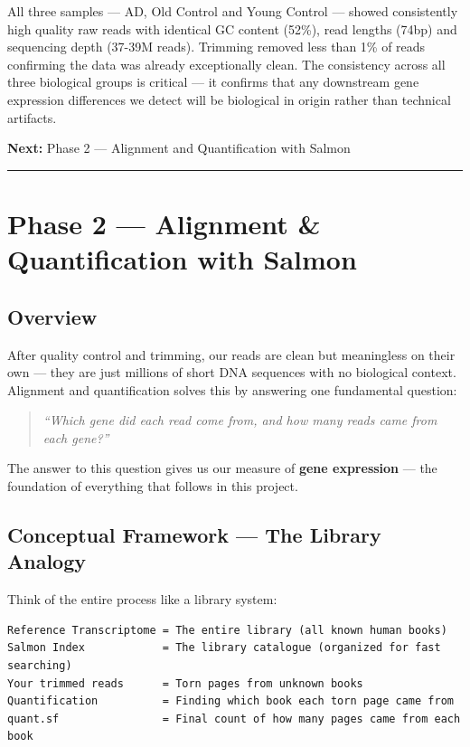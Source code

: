 \documentclass[
]{article}
\begin{document}
All three samples --- AD, Old Control and Young Control --- showed
consistently high quality raw reads with identical GC content (52\%),
read lengths (74bp) and sequencing depth (37-39M reads). Trimming
removed less than 1\% of reads confirming the data was already
exceptionally clean. The consistency across all three biological groups
is critical --- it confirms that any downstream gene expression
differences we detect will be biological in origin rather than technical
artifacts.

\textbf{Next:} Phase 2 --- Alignment and Quantification with Salmon

\begin{center}\rule{0.5\linewidth}{0.5pt}\end{center}

\section{Phase 2 --- Alignment \& Quantification with
Salmon}\label{phase-2-alignment-quantification-with-salmon}

\subsection{Overview}\label{overview-1}

After quality control and trimming, our reads are clean but meaningless
on their own --- they are just millions of short DNA sequences with no
biological context. Alignment and quantification solves this by
answering one fundamental question:

\begin{quote}
\emph{``Which gene did each read come from, and how many reads came from
each gene?''}
\end{quote}

The answer to this question gives us our measure of \textbf{gene
expression} --- the foundation of everything that follows in this
project.

\subsection{Conceptual Framework --- The Library
Analogy}\label{conceptual-framework-the-library-analogy}

Think of the entire process like a library system:

\begin{verbatim}
Reference Transcriptome = The entire library (all known human books)
Salmon Index            = The library catalogue (organized for fast searching)
Your trimmed reads      = Torn pages from unknown books
Quantification          = Finding which book each torn page came from
quant.sf                = Final count of how many pages came from each book
\end{verbatim}
\end{document}

